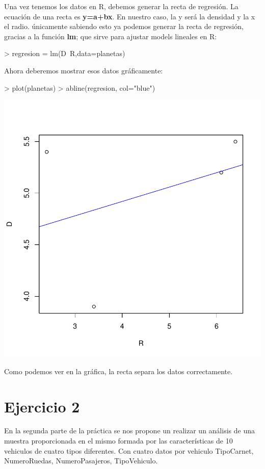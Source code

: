 \documentclass[a4paper]{article}
\begin{document}
Una vez tenemos los datos en R, debemos generar la recta de regresión. La ecuación de una recta es \textbf{y=a+bx}. En nuestro caso, la y será la densidad y la x el radio. únicamente sabiendo esto ya podemos generar la recta de regresión, gracias a la función \textbf{lm}; que sirve para ajustar models lineales en R:
\begin{Schunk}
\begin{Sinput}
> regresion = lm(D~R,data=planetas)
\end{Sinput}
\end{Schunk}

Ahora deberemos mostrar esos datos gráficamente:
\begin{Schunk}
\begin{Sinput}
> plot(planetas)
> abline(regresion, col="blue")
\end{Sinput}
\end{Schunk}

\begin{center}
\includegraphics{practica-3-009}
\end{center}

Como podemos ver en la gráfica, la recta separa los datos correctamente.
\section{Ejercicio 2} En la segunda parte de la práctica se nos propone un realizar un análisis
de una muestra proporcionada en el mismo formada por las características de 10 vehiculos de cuatro
tipos diferentes. Con cuatro datos por vehiculo {TipoCarnet, NumeroRuedas, NumeroPasajeros, TipoVehiculo}.
\end{document}
